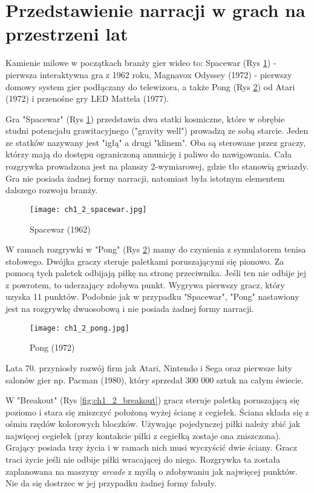 \newpage

\section{Przedstawienie narracji w grach na przestrzeni lat}\label{subsection:ch1_2}

Kamienie milowe w początkach branży gier wideo to: Spacewar (Rys \ref{fig:ch1_2_spacewar}) - pierwsza interaktywna gra z
1962 roku, Magnavox Odyssey (1972) - pierwszy domowy system gier podłączany do telewizora, a
także Pong (Rys \ref{fig:ch1_2_pong}) od Atari (1972) i przenośne gry LED Mattela (1977)\cite{the_evolution_of_video_games}.

Gra "Spacewar" (Rys \ref{fig:ch1_2_spacewar}) przedstawia dwa statki kosmiczne, które w obrębie studni potencjału grawitacyjnego ("gravity well")
prowadzą ze sobą starcie. Jeden ze statków nazywany jest "igłą" a drugi "klinem". Oba są sterowane przez
graczy, którzy mają do dostępu ograniczoną amunicję i paliwo do nawigowania. Cała rozgrywka prowadzona jest
na planszy 2-wymiarowej, gdzie tło stanowią gwiazdy. Gra nie posiada żadnej formy narracji, natomiast była
istotnym elementem dalszego rozwoju branży.

\begin{figure}[h]
	\texttt{[image: ch1\_2\_spacewar.jpg]}
	\caption{Spacewar (1962)}
	\centering
	\label{fig:ch1_2_spacewar}
\end{figure}

W ramach rozgrywki w "Pong" (Rys \ref{fig:ch1_2_pong}) mamy do czynienia z symulatorem tenisa stołowego. Dwójka graczy steruje paletkami
poruszającymi się pionowo. Za pomocą tych paletek odbijają piłkę na stronę przeciwnika. Jeśli ten nie odbije
jej z powrotem, to uderzający zdobywa punkt. Wygrywa pierwszy gracz, który uzyska 11 punktów. Podobnie jak
w przypadku "Spacewar", "Pong" nastawiony jest na rozgrywkę dwuosobową i nie posiada żadnej formy narracji.

\begin{figure}[h]
	\texttt{[image: ch1\_2\_pong.jpg]}
	\caption{Pong (1972)}
	\centering
	\label{fig:ch1_2_pong}
\end{figure}

Lata 70. przyniosły rozwój firm jak Atari, Nintendo i Sega oraz pierwsze hity salonów
gier np. Pacman (1980), który sprzedał 300 000 sztuk na całym świecie\cite{the_evolution_of_video_games}.

W "Breakout" (Rys \ref{fig:ch1_2_breakout}) gracz steruje paletką poruszającą się poziomo i stara się zniszczyć położoną wyżej ścianę
z cegiełek. Ściana składa się z ośmiu rzędów kolorowych bloczków. Używając pojedynczej piłki należy
zbić jak najwięcej cegiełek (przy kontakcie piłki z cegiełką zostaje ona zniszczona). Grający posiada
trzy życia i w ramach nich musi wyczyścić dwie ściany. Gracz traci życie jeśli nie odbije piłki wracającej
do niego. Rozgrywka ta została zaplanowana na maszyny \textit{arcade} z myślą o zdobywaniu jak najwięcej
punktów. Nie da się dostrzec w jej przypadku żadnej formy fabuły.


